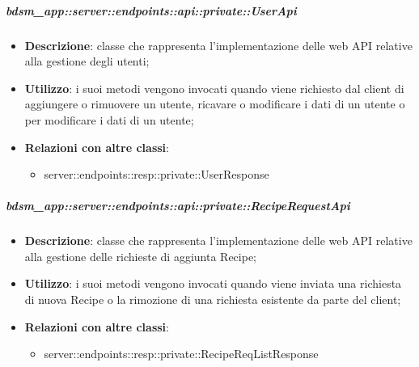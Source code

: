     \subparagraph{bdsm\_app::server::endpoints::api::private::UserApi} %
    \label{subp:bdsm_app_server_endpoints_api_private_userapi}
    \begin{itemize}
      \item \textbf{Descrizione}: classe che rappresenta l'implementazione delle web API relative alla gestione degli utenti;
      \item \textbf{Utilizzo}: i suoi metodi vengono invocati quando viene richiesto dal client di aggiungere o rimuovere un utente, ricavare o modificare i dati di un utente o per modificare i dati di un utente;
      \item \textbf{Relazioni con altre classi}:
        \begin{itemize}
          \item server::endpoints::resp::private::UserResponse
        \end{itemize}
      \end{itemize}

    \subparagraph{bdsm\_app::server::endpoints::api::private::RecipeRequestApi} %
    \label{subp:bdsm_app_server_endpoints_api_private::reciperequestapi}
    \begin{itemize}
      \item \textbf{Descrizione}: classe che rappresenta l'implementazione delle web API relative alla gestione delle richieste di aggiunta Recipe;
      \item \textbf{Utilizzo}: i suoi metodi vengono invocati quando viene inviata una richiesta di nuova Recipe o la rimozione di una richiesta esistente da parte del client;
      \item \textbf{Relazioni con altre classi}:
        \begin{itemize}
          \item server::endpoints::resp::private::RecipeReqListResponse
        \end{itemize}
      \end{itemize}

